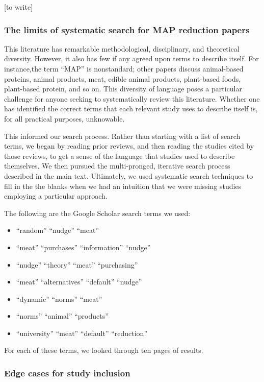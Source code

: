 \documentclass[sn-nature,referee,pdflatex]{sn-jnl}
\providecommand{\tightlist}{%
  \setlength{\itemsep}{0pt}\setlength{\parskip}{0pt}}
\begin{document}
{[}to write{]}

\subsubsection{The limits of systematic search for MAP reduction
papers}\label{sec5.4.1}

This literature has remarkable methodological, disciplinary, and
theoretical diversity. However, it also has few if any agreed upon terms
to describe itself. For instance,the term ``MAP'' is nonstandard; other
papers discuss animal-based proteins, animal products, meat, edible
animal products, plant-based foods, plant-based protein, and so on. This
diversity of language poses a particular challenge for anyone seeking to
systematically review this literature. Whether one has identified the
correct terms that each relevant study uses to describe itself is, for
all practical purposes, unknowable.

This informed our search process. Rather than starting with a list of
search terms, we began by reading prior reviews, and then reading the
studies cited by those reviews, to get a sense of the language that
studies used to describe themselves. We then pursued the multi-pronged,
iterative search process described in the main text. Ultimately, we used
systematic search techniques to fill in the the blanks when we had an
intuition that we were missing studies employing a particular approach.

The following are the Google Scholar search terms we used:

\begin{itemize}
\tightlist
\item
  ``random'' ``nudge'' ``meat''
\item
  ``meat'' ``purchases'' ``information'' ``nudge''
\item
  ``nudge'' ``theory'' ``meat'' ``purchasing''
\item
  ``meat'' ``alternatives'' ``default'' ``nudge''
\item
  ``dynamic'' ``norms'' ``meat''
\item
  ``norms'' ``animal'' ``products''
\item
  ``university'' ``meat'' ``default'' ``reduction''
\end{itemize}

For each of these terms, we looked through ten pages of results.

\subsubsection{Edge cases for study inclusion}\label{sec5.4.2}
\end{document}
